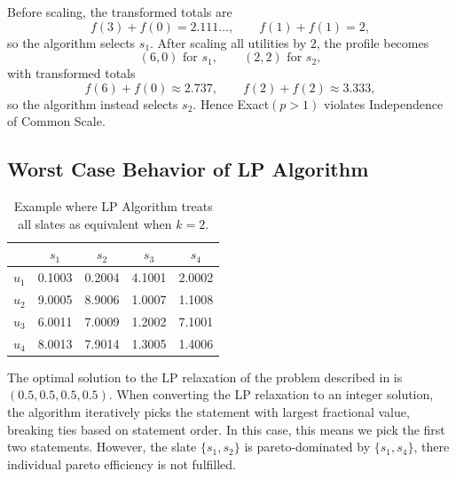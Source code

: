 \documentclass[11pt]{article}
\begin{document}
Before scaling, the transformed totals are
\[
f(3)+f(0)=2.111\ldots, \qquad f(1)+f(1)=2,
\]
so the algorithm selects $s_1$. After scaling all utilities by $2$, the profile becomes
\[
(6,0) \text{ for } s_1, \qquad (2,2) \text{ for } s_2,
\]
with transformed totals
\[
f(6)+f(0)\approx 2.737, \qquad f(2)+f(2) \approx 3.333,
\]
so the algorithm instead selects $s_2$. Hence Exact$(p>1)$ violates Independence of Common Scale.

\subsection{Worst Case Behavior of LP Algorithm}

\begin{table}[t]
\centering
\begin{tabular}{lcccc}
\hline
 & $s_1$ & $s_2$ & $s_3$ & $s_4$ \\
\hline
$u_1$ & 0.1003 & 0.2004 & 4.1001 & 2.0002 \\
$u_2$ & 9.0005 & 8.9006 & 1.0007 & 1.1008 \\
$u_3$ & 6.0011 & 7.0009 & 1.2002 & 7.1001 \\
$u_4$ & 8.0013 & 7.9014 & 1.3005 & 1.4006 \\
\hline
\end{tabular}
\caption{Example where LP Algorithm treats all slates as equivalent when $k=2$.}
\label{tab:lp-worst-case}
\end{table}




The optimal solution to the LP relaxation of the problem described in  is $(0.5, 0.5, 0.5, 0.5)$.
When converting the LP relaxation to an integer solution, the algorithm iteratively picks the statement with largest fractional value, breaking ties based on statement order. In this case, this means we pick the first two statements. However, the slate $\{s_1, s_2\}$ is pareto-dominated by $\{s_1, s_4\}$, there individual pareto efficiency is not fulfilled.
\end{document}
